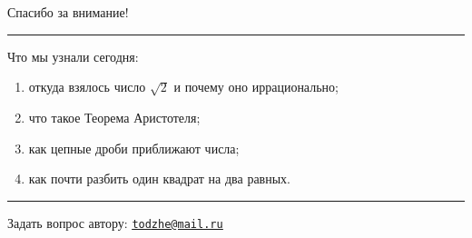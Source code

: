 \documentclass[11pt]{beamer}
\newcommand\fram[2]{\begin{frame}{\bf #1} #2 \end{frame}}
\newcommand{\myref}[2]{\href{#1}{\texttt{\underline{#2}}}}
\begin{document}
\section{ }
\fram{}{
\begin{center}
    {\Large Спасибо за внимание!}
    \vspace{0.5cm} \hrule \vspace{0.3cm}

Что мы узнали сегодня:
\begin{enumerate}
	\item откуда взялось число $\sqrt{2}$ и почему оно иррационально;
	\item что такое Теорема Аристотеля;
	\item как цепные дроби приближают числа;
	\item как почти разбить один квадрат на два равных.
\end{enumerate} \vspace{0.3cm}

    \hrule\vspace{0.5cm}
    Задать вопрос автору:
    \myref{mailto:todzhe@mail.ru}{todzhe@mail.ru}
\end{center}
}
\end{document}
